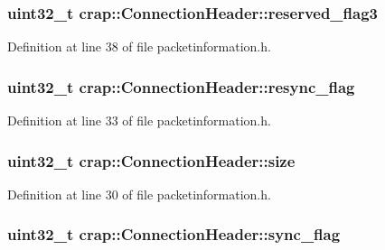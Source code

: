\subsubsection[{reserved\+\_\+flag3}]{\setlength{\rightskip}{0pt plus 5cm}uint32\+\_\+t crap\+::\+Connection\+Header\+::reserved\+\_\+flag3}\label{structcrap_1_1_connection_header_a2dd3b6067b35376ec4c9e272d507ca1e}


Definition at line 38 of file packetinformation.\+h.

\hypertarget{structcrap_1_1_connection_header_a5041797ac0ddf2e6518f97679c8bd8d2}{}
\subsubsection[{resync\+\_\+flag}]{\setlength{\rightskip}{0pt plus 5cm}uint32\+\_\+t crap\+::\+Connection\+Header\+::resync\+\_\+flag}\label{structcrap_1_1_connection_header_a5041797ac0ddf2e6518f97679c8bd8d2}


Definition at line 33 of file packetinformation.\+h.

\hypertarget{structcrap_1_1_connection_header_adc2102490c7feea9156acca68f2c6d9b}{}
\subsubsection[{size}]{\setlength{\rightskip}{0pt plus 5cm}uint32\+\_\+t crap\+::\+Connection\+Header\+::size}\label{structcrap_1_1_connection_header_adc2102490c7feea9156acca68f2c6d9b}


Definition at line 30 of file packetinformation.\+h.

\hypertarget{structcrap_1_1_connection_header_ad94b49aadea4064934e48d57bb3edc56}{}
\subsubsection[{sync\+\_\+flag}]{\setlength{\rightskip}{0pt plus 5cm}uint32\+\_\+t crap\+::\+Connection\+Header\+::sync\+\_\+flag}\label{structcrap_1_1_connection_header_ad94b49aadea4064934e48d57bb3edc56}


